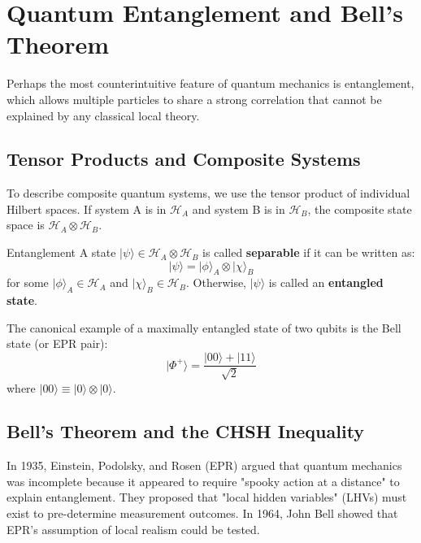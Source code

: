 \chapter{Quantum Entanglement and Bell's Theorem}

Perhaps the most counterintuitive feature of quantum mechanics is entanglement, which allows multiple particles to share a strong correlation that cannot be explained by any classical local theory.

\section{Tensor Products and Composite Systems}

To describe composite quantum systems, we use the tensor product of individual Hilbert spaces. If system A is in \(\mathcal{H}_A\) and system B is in \(\mathcal{H}_B\), the composite state space is \(\mathcal{H}_A \otimes \mathcal{H}_B\).

\begin{definitionbox}{Entanglement}
A state \(|\psi\rangle \in \mathcal{H}_A \otimes \mathcal{H}_B\) is called \textbf{separable} if it can be written as:
\[
|\psi\rangle = |\phi\rangle_A \otimes |\chi\rangle_B
\]
for some \(|\phi\rangle_A \in \mathcal{H}_A\) and \(|\chi\rangle_B \in \mathcal{H}_B\). Otherwise, \(|\psi\rangle\) is called an \textbf{entangled state}.
\end{definitionbox}

The canonical example of a maximally entangled state of two qubits is the Bell state (or EPR pair):
\[
|\Phi^+\rangle = \frac{|00\rangle + |11\rangle}{\sqrt{2}}
\]
where \(|00\rangle \equiv |0\rangle \otimes |0\rangle\).

\section{Bell's Theorem and the CHSH Inequality}

In 1935, Einstein, Podolsky, and Rosen (EPR) argued that quantum mechanics was incomplete because it appeared to require "spooky action at a distance" to explain entanglement. They proposed that "local hidden variables" (LHVs) must exist to pre-determine measurement outcomes.
In 1964, John Bell showed that EPR's assumption of local realism could be tested.

